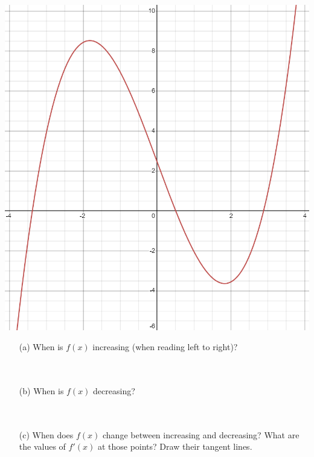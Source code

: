\documentclass[12pt]{article}
\begin{document}
\begin{minipage}[c]{0.6\linewidth}
    \begin{center}
        \includegraphics[scale=0.6, trim=0 80 0 50,clip]{cubic.png}
    \end{center}
\end{minipage}
\begin{minipage}[c]{0.4\linewidth}
\begin{itemize}
\item[(a)] When is $f(x)$ increasing (when reading left to right)?\\\\\\
\item[(b)] When is $f(x)$ decreasing?\\\\\\
\item[(c)] When does $f(x)$ change between increasing and decreasing? What are the values of $f'(x)$ at those points? Draw their tangent lines.\\\\\\

\end{itemize}
\end{minipage}
\\
\end{document}
